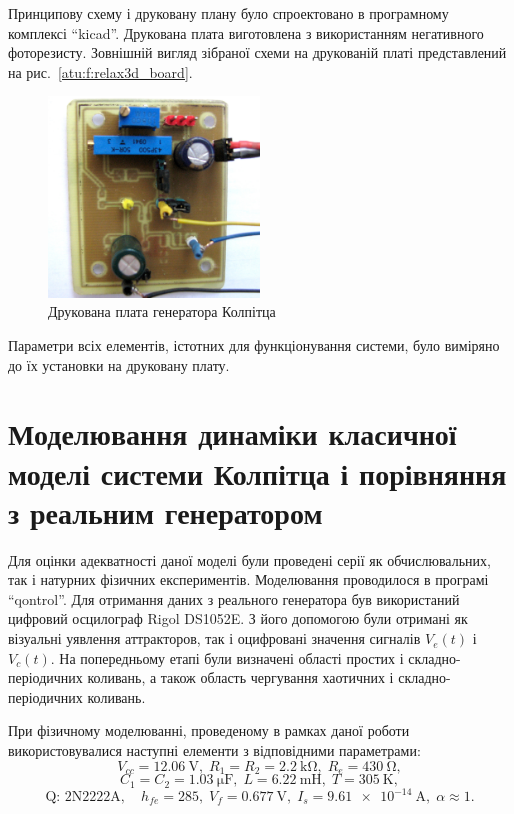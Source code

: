Принципову схему і друковану плану було спроектовано в
програмному комплексі ``kicad''. Друкована плата виготовлена
з використанням негативного фоторезисту. Зовнішній
вигляд зібраної схеми на друкованій платі представлений
на рис.~\ref{atu:f:relax3d_board}.

\begin{figure}[htb!]
\centerline{\includegraphics[width=0.5\textwidth]{p/colp_board.jpg} }
\caption{Друкована плата генератора Колпітца}
\label{atu:f:colp_board}
\end{figure}

Параметри всіх елементів, істотних для функціонування системи,
було виміряно до їх установки на друковану плату.



\section{Моделювання динаміки класичної моделі системи Колпітца і порівняння з реальним генератором}%

Для оцінки адекватності даної моделі були проведені
серії як обчислювальних, так і натурних фізичних
експериментів.
Моделювання проводилося в програмі ``qontrol''.
Для отримання даних з реального генератора був використаний
цифровий осцилограф Rigol DS1052E. З його допомогою були отримані
як візуальні уявлення аттракторов, так і оцифровані значення
сигналів
$V_e (t) $ і
$V_c (t) $. На попередньому етапі були визначені області простих
і складно-періодичних коливань, а також область чергування
хаотичних і складно-періодичних коливань.

При фізичному моделюванні, проведеному в рамках даної
роботи використовувалися наступні елементи з відповідними
параметрами:
%
\[
  V_{cc} = \SI{12.06}{\volt},          \;
  R_1 = R_2 = \SI{2.2}{\kilo\ohm},     \;
  R_e = \SI{430}{\ohm},
\]
%
\[
  C_1 = C_2 = \SI{1.03}{\micro\farad}, \;
  L = \SI{6.22}{\milli\henry},         \;
  T = \SI{305}{\kelvin},
\]
%
\[
  \text{Q: 2N2222A}, \quad
  h_{fe}=285, \;
  V_f = \SI{0.677}{\volt}, \;
  I_s = \SI{9.61e-14}{\ampere}, \;
  \alpha \approx 1.
\]

